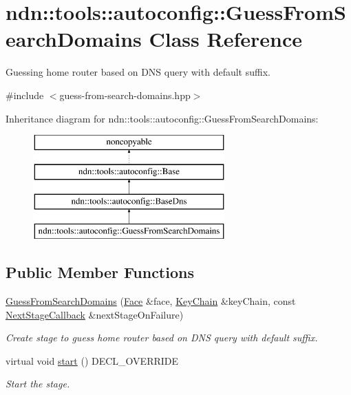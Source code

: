 \hypertarget{classndn_1_1tools_1_1autoconfig_1_1GuessFromSearchDomains}{}\section{ndn\+:\+:tools\+:\+:autoconfig\+:\+:Guess\+From\+Search\+Domains Class Reference}
\label{classndn_1_1tools_1_1autoconfig_1_1GuessFromSearchDomains}


Guessing home router based on D\+NS query with default suffix.  




{\ttfamily \#include $<$guess-\/from-\/search-\/domains.\+hpp$>$}

Inheritance diagram for ndn\+:\+:tools\+:\+:autoconfig\+:\+:Guess\+From\+Search\+Domains\+:\begin{figure}[H]
\begin{center}
\leavevmode
\includegraphics[height=4.000000cm]{classndn_1_1tools_1_1autoconfig_1_1GuessFromSearchDomains}
\end{center}
\end{figure}
\subsection*{Public Member Functions}
\begin{DoxyCompactItemize}
\item 
\hyperlink{classndn_1_1tools_1_1autoconfig_1_1GuessFromSearchDomains_a4fc013c6c0508e5db3a01f6c58694b8e}{Guess\+From\+Search\+Domains} (\hyperlink{classndn_1_1Face}{Face} \&face, \hyperlink{classndn_1_1security_1_1KeyChain}{Key\+Chain} \&key\+Chain, const \hyperlink{classndn_1_1tools_1_1autoconfig_1_1Base_a1b9466e64370f1ead34b754096562445}{Next\+Stage\+Callback} \&next\+Stage\+On\+Failure)
\begin{DoxyCompactList}\small\item\em Create stage to guess home router based on D\+NS query with default suffix. \end{DoxyCompactList}\item 
virtual void \hyperlink{classndn_1_1tools_1_1autoconfig_1_1GuessFromSearchDomains_a006ca01ea98a1feeeca8a7f913dd35ef}{start} () D\+E\+C\+L\+\_\+\+O\+V\+E\+R\+R\+I\+DE\hypertarget{classndn_1_1tools_1_1autoconfig_1_1GuessFromSearchDomains_a006ca01ea98a1feeeca8a7f913dd35ef}{}\label{classndn_1_1tools_1_1autoconfig_1_1GuessFromSearchDomains_a006ca01ea98a1feeeca8a7f913dd35ef}

\begin{DoxyCompactList}\small\item\em Start the stage. \end{DoxyCompactList}\end{DoxyCompactItemize}
